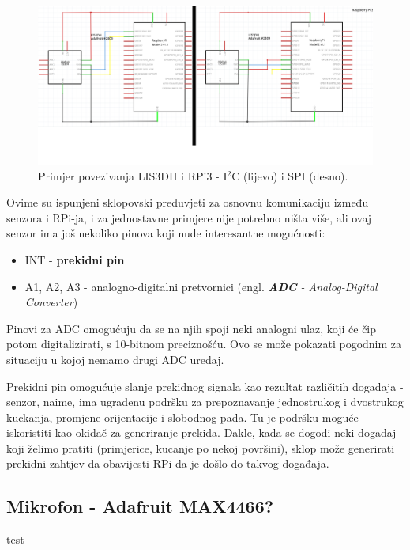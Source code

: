 \documentclass[12pt,a4paper]{article}
\begin{document}
		\begin{figure}[h!]
			\includegraphics[width=\linewidth]{slike/i2cSpiMergeNoLabel.png}
			\caption{Primjer povezivanja LIS3DH i RPi3 - I$^2$C (lijevo) i SPI (desno).}
			\label{fig:lis3dhRpi}
		\end{figure}

		\par Ovime su ispunjeni sklopovski preduvjeti za osnovnu komunikaciju između senzora i RPi-ja, i za jednostavne primjere nije potrebno ništa više, ali ovaj senzor ima još nekoliko pinova koji nude interesantne mogućnosti:
		\begin{itemize}
			\item INT - \textbf{prekidni pin}
			\item A1, A2, A3 - analogno-digitalni pretvornici (engl. \textit{\textbf{ADC} - Analog-Digital Converter}) \\
		\end{itemize}

		Pinovi za ADC omogućuju da se na njih spoji neki analogni ulaz, koji će čip potom digitalizirati, s 10-bitnom preciznošću. Ovo se može pokazati pogodnim za situaciju u kojoj nemamo drugi ADC uređaj. 

		\par Prekidni pin omogućuje slanje prekidnog signala kao rezultat različitih događaja - senzor, naime, ima ugrađenu podršku za prepoznavanje jednostrukog i dvostrukog kuckanja, promjene orijentacije i slobodnog pada. Tu je podršku moguće iskoristiti kao okidač za generiranje prekida. Dakle, kada se dogodi neki događaj koji želimo pratiti (primjerice, kucanje po nekoj površini), sklop može generirati prekidni zahtjev da obavijesti RPi da je došlo do takvog događaja.


	\newpage
	\subsection{Mikrofon - Adafruit MAX4466?}
	test
\newpage
\end{document}
